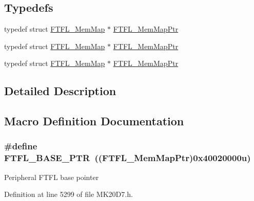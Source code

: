 \subsection*{Typedefs}
\begin{DoxyCompactItemize}
\item 
typedef struct \hyperlink{struct_f_t_f_l___mem_map}{F\+T\+F\+L\+\_\+\+Mem\+Map} $\ast$ \hyperlink{group___f_t_f_l___peripheral_ga7bcba0a1f0abf588061f4ab257e3fe48}{F\+T\+F\+L\+\_\+\+Mem\+Map\+Ptr}
\item 
typedef struct \hyperlink{struct_f_t_f_l___mem_map}{F\+T\+F\+L\+\_\+\+Mem\+Map} $\ast$ \hyperlink{group___f_t_f_l___peripheral_ga7bcba0a1f0abf588061f4ab257e3fe48}{F\+T\+F\+L\+\_\+\+Mem\+Map\+Ptr}
\item 
typedef struct \hyperlink{struct_f_t_f_l___mem_map}{F\+T\+F\+L\+\_\+\+Mem\+Map} $\ast$ \hyperlink{group___f_t_f_l___peripheral_ga7bcba0a1f0abf588061f4ab257e3fe48}{F\+T\+F\+L\+\_\+\+Mem\+Map\+Ptr}
\end{DoxyCompactItemize}


\subsection{Detailed Description}


\subsection{Macro Definition Documentation}
\subsubsection[{\texorpdfstring{F\+T\+F\+L\+\_\+\+B\+A\+S\+E\+\_\+\+P\+TR}{FTFL_BASE_PTR}}]{\setlength{\rightskip}{0pt plus 5cm}\#define F\+T\+F\+L\+\_\+\+B\+A\+S\+E\+\_\+\+P\+TR~(({\bf F\+T\+F\+L\+\_\+\+Mem\+Map\+Ptr})0x40020000u)}\hypertarget{group___f_t_f_l___peripheral_gad2bcbae914ba8547b96791479afda939}{}\label{group___f_t_f_l___peripheral_gad2bcbae914ba8547b96791479afda939}
Peripheral F\+T\+FL base pointer 

Definition at line 5299 of file M\+K20\+D7.\+h.

